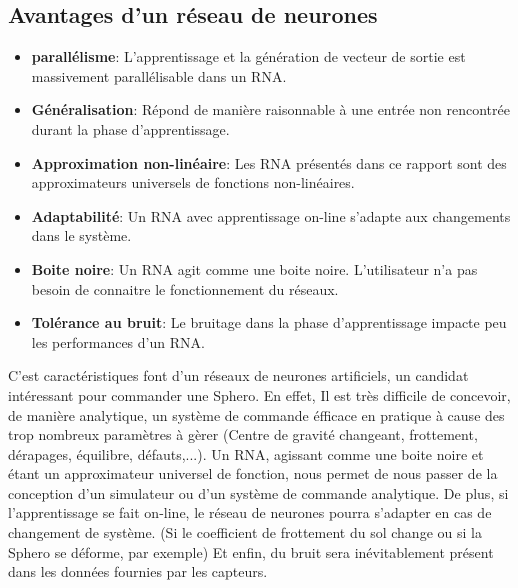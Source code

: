 \subsection{Avantages d'un réseau de neurones}
\begin{itemize}
 \item \textbf{parallélisme}: L'apprentissage et la génération de vecteur de sortie est massivement parallélisable dans un RNA.\cite{corelet,Haykin}
 \item \textbf{Généralisation}: Répond de manière raisonnable à une entrée non rencontrée durant la phase d'apprentissage.\cite{statistica,Haykin}
 \item \textbf{Approximation non-linéaire}: Les RNA présentés dans ce rapport sont des approximateurs universels de fonctions non-linéaires.\cite{Haykin}
 \item \textbf{Adaptabilité}: Un RNA avec apprentissage on-line s'adapte aux changements dans le système.\cite{Haykin}
 \item \textbf{Boite noire}: Un RNA agit comme une boite noire. L'utilisateur n'a pas besoin de connaitre le fonctionnement du réseaux.
 \item \textbf{Tolérance au bruit}: Le bruitage dans la phase d'apprentissage impacte peu les performances d'un RNA.\cite{Haykin}
\end{itemize}
C'est caractéristiques font d'un réseaux de neurones artificiels, un candidat intéressant pour commander une Sphero. 
En effet, Il est très difficile de concevoir, de manière analytique, un système de commande éfficace en pratique à cause des trop nombreux paramètres à gèrer (Centre de gravité changeant, frottement, dérapages, équilibre, défauts,...).
Un RNA, agissant comme une boite noire et étant un approximateur universel de fonction, nous permet de nous passer de la conception d'un simulateur ou d'un système de commande analytique.
De plus, si l'apprentissage se fait on-line, le réseau de neurones pourra s'adapter en cas de changement de système. (Si le coefficient de frottement du sol change ou si la Sphero se déforme, par exemple)
Et enfin, du bruit sera inévitablement présent dans les données fournies par les capteurs.